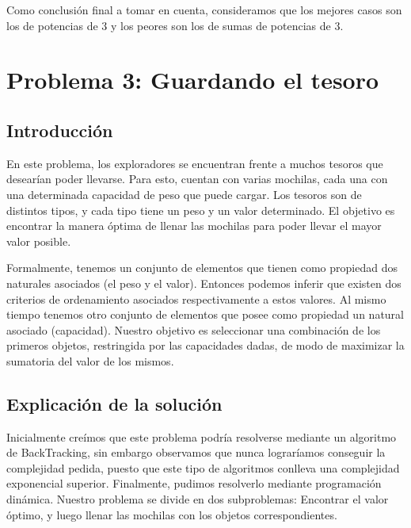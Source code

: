 \documentclass[spanish,12pt]{article}
\begin{document}
Como conclusión final a tomar en cuenta, consideramos que los mejores casos son los de potencias de 3 y los peores son los de sumas de potencias de 3.






\section{Problema 3: Guardando el tesoro}

\subsection{Introducción}

En este problema, los exploradores se encuentran frente a muchos tesoros que desearían poder llevarse. Para esto, cuentan con varias mochilas, cada una con una determinada capacidad de peso que puede cargar.
Los tesoros son de distintos tipos, y cada tipo tiene un peso y un valor determinado.
El objetivo es encontrar la manera óptima de llenar las mochilas para poder llevar el mayor valor posible.

Formalmente, tenemos un conjunto de elementos que tienen como propiedad dos naturales asociados (el peso y el valor). Entonces podemos inferir que existen dos criterios de ordenamiento asociados respectivamente a estos valores.
Al mismo tiempo tenemos otro conjunto de elementos que posee como propiedad un natural asociado (capacidad).
Nuestro objetivo es seleccionar una combinación de los primeros objetos, restringida por las capacidades dadas, de modo de maximizar la sumatoria del valor de los mismos. 


\subsection{Explicación de la solución}

   Inicialmente creímos que este problema podría resolverse mediante un algoritmo de BackTracking, sin embargo observamos que nunca lograríamos conseguir la complejidad pedida, puesto que este tipo de algoritmos conlleva una complejidad exponencial superior.
   Finalmente, pudimos resolverlo mediante programación dinámica. Nuestro problema se divide en dos subproblemas:
   Encontrar el valor óptimo, y luego llenar las mochilas con los objetos correspondientes.
\end{document}
